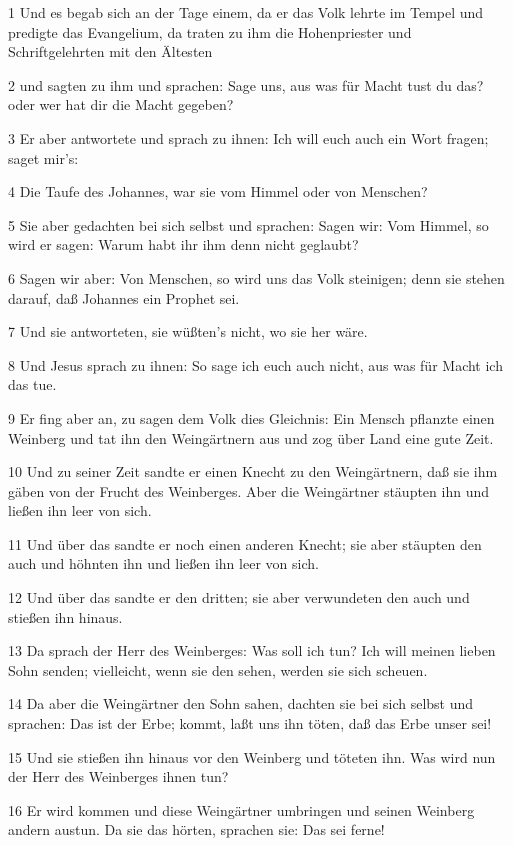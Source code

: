 \par 1 Und es begab sich an der Tage einem, da er das Volk lehrte im Tempel und predigte das Evangelium, da traten zu ihm die Hohenpriester und Schriftgelehrten mit den Ältesten
\par 2 und sagten zu ihm und sprachen: Sage uns, aus was für Macht tust du das? oder wer hat dir die Macht gegeben?
\par 3 Er aber antwortete und sprach zu ihnen: Ich will euch auch ein Wort fragen; saget mir's:
\par 4 Die Taufe des Johannes, war sie vom Himmel oder von Menschen?
\par 5 Sie aber gedachten bei sich selbst und sprachen: Sagen wir: Vom Himmel, so wird er sagen: Warum habt ihr ihm denn nicht geglaubt?
\par 6 Sagen wir aber: Von Menschen, so wird uns das Volk steinigen; denn sie stehen darauf, daß Johannes ein Prophet sei.
\par 7 Und sie antworteten, sie wüßten's nicht, wo sie her wäre.
\par 8 Und Jesus sprach zu ihnen: So sage ich euch auch nicht, aus was für Macht ich das tue.
\par 9 Er fing aber an, zu sagen dem Volk dies Gleichnis: Ein Mensch pflanzte einen Weinberg und tat ihn den Weingärtnern aus und zog über Land eine gute Zeit.
\par 10 Und zu seiner Zeit sandte er einen Knecht zu den Weingärtnern, daß sie ihm gäben von der Frucht des Weinberges. Aber die Weingärtner stäupten ihn und ließen ihn leer von sich.
\par 11 Und über das sandte er noch einen anderen Knecht; sie aber stäupten den auch und höhnten ihn und ließen ihn leer von sich.
\par 12 Und über das sandte er den dritten; sie aber verwundeten den auch und stießen ihn hinaus.
\par 13 Da sprach der Herr des Weinberges: Was soll ich tun? Ich will meinen lieben Sohn senden; vielleicht, wenn sie den sehen, werden sie sich scheuen.
\par 14 Da aber die Weingärtner den Sohn sahen, dachten sie bei sich selbst und sprachen: Das ist der Erbe; kommt, laßt uns ihn töten, daß das Erbe unser sei!
\par 15 Und sie stießen ihn hinaus vor den Weinberg und töteten ihn. Was wird nun der Herr des Weinberges ihnen tun?
\par 16 Er wird kommen und diese Weingärtner umbringen und seinen Weinberg andern austun. Da sie das hörten, sprachen sie: Das sei ferne!
